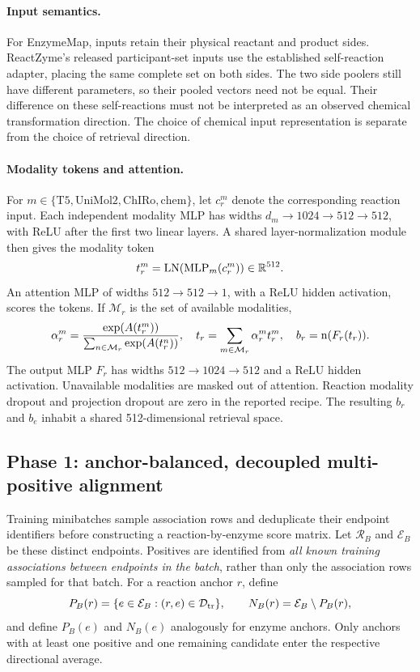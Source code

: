 \paragraph{Input semantics.}
For EnzymeMap, inputs retain their physical reactant and product sides.
ReactZyme's released participant-set inputs use the established self-reaction
adapter, placing the same complete set on both sides. The two side poolers
still have different parameters, so their pooled vectors need not be equal.
Their difference on these self-reactions must not be interpreted as an
observed chemical transformation direction. The choice of chemical input
representation is separate from the choice of retrieval direction.

\paragraph{Modality tokens and attention.}
For $m\in\{\mathrm{T5},\mathrm{UniMol2},\mathrm{ChIRo},\mathrm{chem}\}$,
let $c_r^m$ denote the corresponding reaction input. Each independent modality
MLP has widths $d_m\!\to\!1024\!\to\!512\!\to\!512$, with ReLU after
the first two linear layers. A shared layer-normalization module then gives
the modality token
\begin{equation}
  t_r^m=\operatorname{LN}(\operatorname{MLP}_m(c_r^m))\in\mathbb{R}^{512}.
\end{equation}
An attention MLP of widths $512\!\to\!512\!\to\!1$, with a ReLU hidden
activation, scores the tokens. If $\mathcal M_r$ is the set of available
modalities,
\begin{equation}
  \alpha_r^m=
  \frac{\exp(A(t_r^m))}{\sum_{n\in\mathcal M_r}\exp(A(t_r^n))},
  \quad
  t_r=\sum_{m\in\mathcal M_r}\alpha_r^m t_r^m,
  \quad
  b_r=\operatorname{n}(F_r(t_r)).
  \label{eq:v4-reaction-output}
\end{equation}
The output MLP $F_r$ has widths $512\!\to\!1024\!\to\!512$ and a ReLU
hidden activation. Unavailable modalities are masked out of attention.
Reaction modality dropout and projection dropout are zero in the reported
recipe. The resulting $b_r$ and $b_e$ inhabit a shared 512-dimensional
retrieval space.

\subsection{Phase 1: anchor-balanced, decoupled multi-positive alignment}
\label{sec:v4-phase1}
Training minibatches sample association rows and deduplicate their endpoint
identifiers before constructing a reaction-by-enzyme score matrix. Let
$\mathcal R_B$ and $\mathcal E_B$ be these distinct endpoints. Positives are
identified from \emph{all known training associations between endpoints in
the batch}, rather than only the association rows sampled for that batch.
For a reaction anchor $r$, define
\begin{equation}
  P_B(r)=\{e\in\mathcal E_B:(r,e)\in\mathcal{D}_{\mathrm{tr}}\},\qquad
  N_B(r)=\mathcal E_B\setminus P_B(r),
\end{equation}
and define $P_B(e)$ and $N_B(e)$ analogously for enzyme anchors. Only anchors
with at least one positive and one remaining candidate enter the respective
directional average.

